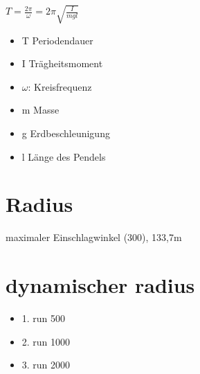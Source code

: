\documentclass[10pt]{article}
\begin{document}
$T=\frac{2\pi}{\omega} = 2\pi\sqrt{\frac{I}{mgl}}$
\begin{itemize}
\item T Periodendauer
\item I Trägheitsmoment
\item $\omega$: Kreisfrequenz
\item m Masse
\item g Erdbeschleunigung
\item l Länge des Pendels
\end{itemize}


\section{Radius}
maximaler Einschlagwinkel (300), 133,7m


\section{dynamischer radius}
\begin{itemize}
    \item 1. run 500
    \item 2. run 1000
    \item 3. run 2000
\end{itemize}
\end{document}
